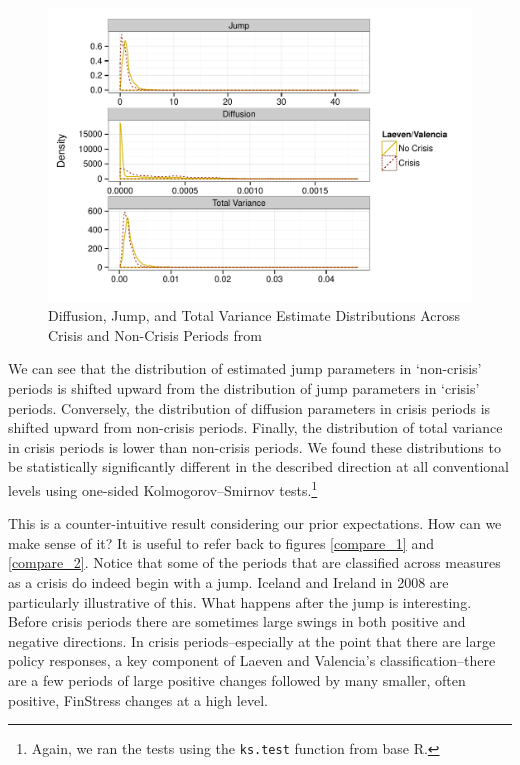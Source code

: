 \documentclass[]{article}
\begin{document}
\begin{figure}
    \caption{Diffusion, Jump, and Total Variance Estimate Distributions Across Crisis and Non-Crisis Periods from \cite{laeven2013}}
    \label{comp_jump_diff}
    \begin{center}
        \includegraphics[scale=0.7]{figures/compare_jump_diffusion_basic.pdf}
    \end{center}
\end{figure}

We can see that the distribution of estimated jump parameters in `non-crisis' periods is shifted upward from the distribution of jump parameters in `crisis' periods. Conversely, the distribution of diffusion parameters in crisis periods is shifted upward from non-crisis periods. Finally, the distribution of total variance in crisis periods is lower than non-crisis periods. We found these distributions to be statistically significantly different in the described direction at all conventional levels using one-sided Kolmogorov–Smirnov tests.\footnote{Again, we ran the tests using the \texttt{ks.test} function from base R.}

This is a counter-intuitive result considering our prior expectations. How can we make sense of it? It is useful to refer back to figures \ref{compare_1} and \ref{compare_2}. Notice that some of the periods that are classified across measures as a crisis do indeed begin with a jump. Iceland and Ireland in 2008 are particularly illustrative of this. What happens after the jump is interesting. Before crisis periods there are sometimes large swings in both positive and negative directions. In crisis periods--especially at the point that there are large policy responses, a key component of Laeven and Valencia's classification--there are a few periods of large positive changes followed by many smaller, often positive, FinStress changes at a high level.
\end{document}
